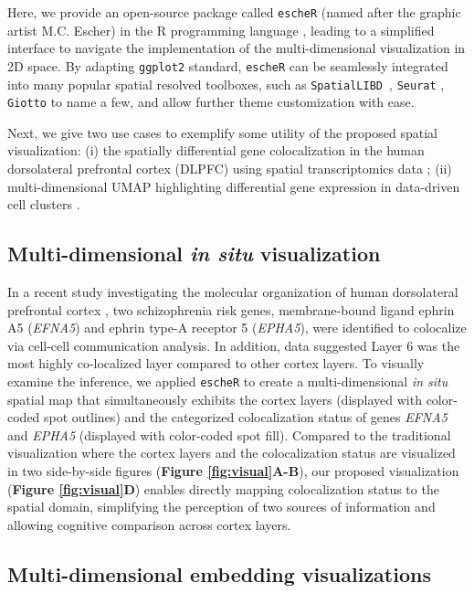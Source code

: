 \documentclass[10pt,twocolumn]{article}
\begin{document}
Here, we provide an open-source package called \texttt{escheR} (named after the graphic artist M.C. Escher) in the R programming language \cite{R}, leading to a simplified interface to navigate the implementation of the multi-dimensional visualization in 2D space. By adapting \texttt{ggplot2} standard, \texttt{escheR} can be seamlessly integrated into many popular spatial resolved toolboxes, such as \texttt{SpatialLIBD }\cite{pardo_2022}, \texttt{Seurat} \cite{hao_2021}, \texttt{Giotto} \cite{dries_2021} to name a few, and allow further theme customization with ease.

Next, we give two use cases to exemplify some utility of the proposed spatial visualization: (i) the spatially differential gene colocalization in the human dorsolateral prefrontal cortex (DLPFC) using spatial transcriptomics data \cite{huukimyers_2023}; (ii) multi-dimensional UMAP highlighting differential gene expression in data-driven cell clusters \cite{freytag_2020}. 



\subsection{Multi-dimensional \textit{in situ} visualization}
In a recent study investigating the molecular organization of human dorsolateral prefrontal cortex \cite{huukimyers_2023}, two schizophrenia risk genes, membrane-bound ligand ephrin A5 (\textit{EFNA5}) and ephrin type-A receptor 5 (\textit{EPHA5}), were identified to colocalize via cell-cell communication analysis. In addition, data suggested Layer 6 was the most highly co-localized layer compared to other cortex layers. To visually examine the inference, we applied \texttt{escheR} to create a multi-dimensional \textit{in situ} spatial map that simultaneously exhibits the cortex layers (displayed with color-coded spot outlines) and the categorized colocalization status of genes \textit{EFNA5} and \textit{EPHA5} (displayed with color-coded spot fill). Compared to the traditional visualization where the cortex layers and the colocalization status are visualized in two side-by-side figures (\textbf{Figure \ref{fig:visual}A-B}), our proposed visualization (\textbf{Figure \ref{fig:visual}D}) enables directly mapping colocalization status to the spatial domain, simplifying the perception of two sources of information and allowing cognitive comparison across cortex layers. 

\subsection{Multi-dimensional embedding visualizations}
\end{document}
